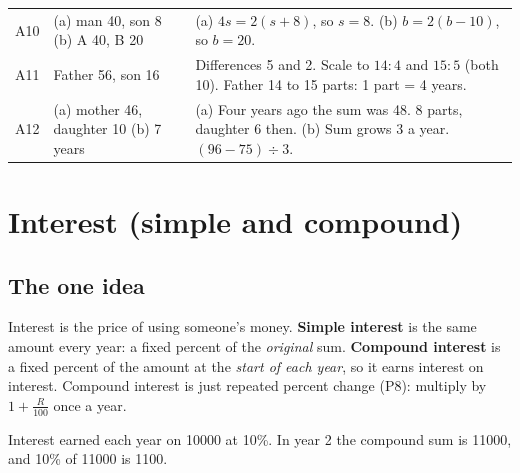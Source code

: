 \documentclass[11pt,a4paper]{article}
\let\oldsubsection\subsection
\renewcommand{\subsection}{\needspace{9\baselineskip}\oldsubsection}
\begin{document}
\begin{center}
\begin{tabularx}{\linewidth}{@{}l>{\raggedright\arraybackslash}p{3.4cm}>{\raggedright\arraybackslash}X@{}}
A10 & (a) man 40, son 8 \newline (b) A 40, B 20 & (a) $4s = 2(s + 8)$, so $s = 8$. \newline (b) $b = 2(b - 10)$, so $b = 20$. \\
A11 & Father 56, son 16 & Differences 5 and 2. Scale to $14 : 4$ and $15 : 5$ (both 10). \newline Father 14 to 15 parts: 1 part = 4 years. \\
A12 & (a) mother 46, daughter 10 \newline (b) 7 years & (a) Four years ago the sum was 48. 8 parts, daughter 6 then. \newline (b) Sum grows 3 a year. $(96 - 75) \div 3$. \\
\bottomrule
\end{tabularx}\end{center}

\clearpage
\section[Interest (I1--I12)]{Interest (simple and compound)}\label{ch:I}

\subsection*{The one idea}
Interest is the price of using someone's money. \textbf{Simple interest} is the same amount every year: a fixed percent of the \emph{original} sum. \textbf{Compound interest} is a fixed percent of the amount at the \emph{start of each year}, so it earns interest on interest. Compound interest is just repeated percent change (P8): multiply by $1+\tfrac{R}{100}$ once a year.

\begin{center}
\par\nopagebreak\smallskip
{\small Interest earned each year on 10000 at 10\%. In year 2 the compound sum is 11000, and 10\% of 11000 is 1100.}
\end{center}
\end{document}
